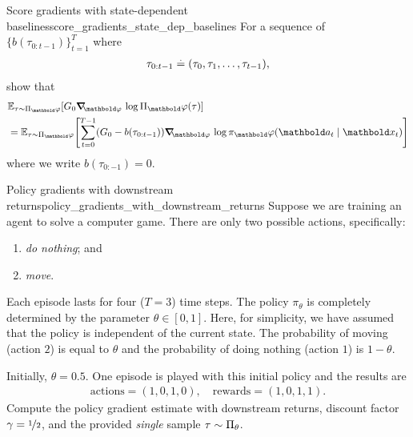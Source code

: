 \begin{nexercise}{Score gradients with state-dependent baselines}{score_gradients_state_dep_baselines}
  For a sequence of  $\{b(\tau_{0:t-1})\}_{t=1}^T$ where \begin{align*}
    \tau_{0:t-1} \overset{.}{=} (\tau_0, \tau_1, \dots, \tau_{t-1}),
  \end{align*} show that \begin{align}\begin{split}
    &\E[\tau \sim \altpi_\vvarphi]{G_0 \grad_\vvarphi \log \altpi_\vvarphi(\tau)} \\
    &= \E[\tau \sim \altpi_\vvarphi]{\sum_{t=0}^{T-1} (G_0 - b(\tau_{0:t-1})) \grad_\vvarphi \log \pi_\vvarphi(\va_t \mid \vx_t)}
  \end{split}\label{eq:score_gradient_estimator_state_dep_baseline}\end{align} where we write $b(\tau_{0:-1}) = 0$.
\end{nexercise}

\begin{nexercise}{Policy gradients with downstream returns}{policy_gradients_with_downstream_returns}
  Suppose we are training an agent to solve a computer game.
  There are only two possible actions, specifically: \begin{enumerate}
    \item \emph{do nothing}; and
    \item \emph{move}.
  \end{enumerate}
  Each episode lasts for four ($T = 3$) time steps.
  The policy $\pi_\theta$ is completely determined by the parameter $\theta \in [0,1]$.
  Here, for simplicity, we have assumed that the policy is independent of the current state.
  The probability of moving (action $2$) is equal to $\theta$ and the probability of doing nothing (action $1$) is $1 - \theta$.

  Initially, $\theta = 0.5$.
  One episode is played with this initial policy and the results are \begin{align*}
    \text{actions} = (1, 0, 1, 0), \quad \text{rewards} = (1, 0, 1, 1).
  \end{align*}
  Compute the policy gradient estimate with downstream returns, discount factor $\gamma = \nicefrac{1}{2}$, and the provided \emph{single} sample $\tau \sim \Pi_\theta$.
\end{nexercise}

